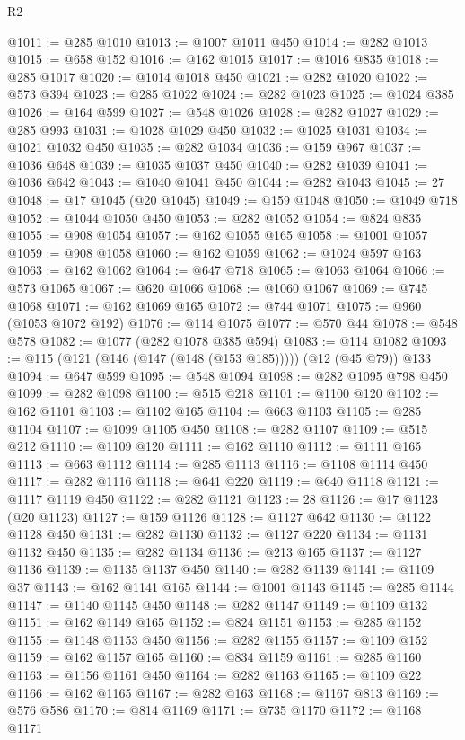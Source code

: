 \begin{lexlean}{R2}
\begin{coremodule}
@1011 := @285 @1010
@1013 := @1007 @1011 @450
@1014 := @282 @1013
@1015 := @658 @152
@1016 := @162 @1015
@1017 := @1016 @835
@1018 := @285 @1017
@1020 := @1014 @1018 @450
@1021 := @282 @1020
@1022 := @573 @394
@1023 := @285 @1022
@1024 := @282 @1023
@1025 := @1024 @385
@1026 := @164 @599
@1027 := @548 @1026
@1028 := @282 @1027
@1029 := @285 @993
@1031 := @1028 @1029 @450
@1032 := @1025 @1031
@1034 := @1021 @1032 @450
@1035 := @282 @1034
@1036 := @159 @967
@1037 := @1036 @648
@1039 := @1035 @1037 @450
@1040 := @282 @1039
@1041 := @1036 @642
@1043 := @1040 @1041 @450
@1044 := @282 @1043
@1045 := 27
@1048 := @17 @1045 (@20 @1045)
@1049 := @159 @1048
@1050 := @1049 @718
@1052 := @1044 @1050 @450
@1053 := @282 @1052
@1054 := @824 @835
@1055 := @908 @1054
@1057 := @162 @1055 @165
@1058 := @1001 @1057
@1059 := @908 @1058
@1060 := @162 @1059
@1062 := @1024 @597 @163
@1063 := @162 @1062
@1064 := @647 @718
@1065 := @1063 @1064
@1066 := @573 @1065
@1067 := @620 @1066
@1068 := @1060 @1067
@1069 := @745 @1068
@1071 := @162 @1069 @165
@1072 := @744 @1071
@1075 := @960 (@1053 @1072 @192)
@1076 := @114 @1075
@1077 := @570 @44
@1078 := @548 @578
@1082 := @1077 (@282 @1078 @385 @594)
@1083 := @114 @1082
@1093 := @115 (@121 (@146 (@147 (@148 (@153 @185))))) (@12 (@45 @79)) @133
@1094 := @647 @599
@1095 := @548 @1094
@1098 := @282 @1095 @798 @450
@1099 := @282 @1098
@1100 := @515 @218
@1101 := @1100 @120
@1102 := @162 @1101
@1103 := @1102 @165
@1104 := @663 @1103
@1105 := @285 @1104
@1107 := @1099 @1105 @450
@1108 := @282 @1107
@1109 := @515 @212
@1110 := @1109 @120
@1111 := @162 @1110
@1112 := @1111 @165
@1113 := @663 @1112
@1114 := @285 @1113
@1116 := @1108 @1114 @450
@1117 := @282 @1116
@1118 := @641 @220
@1119 := @640 @1118
@1121 := @1117 @1119 @450
@1122 := @282 @1121
@1123 := 28
@1126 := @17 @1123 (@20 @1123)
@1127 := @159 @1126
@1128 := @1127 @642
@1130 := @1122 @1128 @450
@1131 := @282 @1130
@1132 := @1127 @220
@1134 := @1131 @1132 @450
@1135 := @282 @1134
@1136 := @213 @165
@1137 := @1127 @1136
@1139 := @1135 @1137 @450
@1140 := @282 @1139
@1141 := @1109 @37
@1143 := @162 @1141 @165
@1144 := @1001 @1143
@1145 := @285 @1144
@1147 := @1140 @1145 @450
@1148 := @282 @1147
@1149 := @1109 @132
@1151 := @162 @1149 @165
@1152 := @824 @1151
@1153 := @285 @1152
@1155 := @1148 @1153 @450
@1156 := @282 @1155
@1157 := @1109 @152
@1159 := @162 @1157 @165
@1160 := @834 @1159
@1161 := @285 @1160
@1163 := @1156 @1161 @450
@1164 := @282 @1163
@1165 := @1109 @22
@1166 := @162 @1165
@1167 := @282 @163
@1168 := @1167 @813
@1169 := @576 @586
@1170 := @814 @1169
@1171 := @735 @1170
@1172 := @1168 @1171

\end{coremodule}
\end{lexlean}

